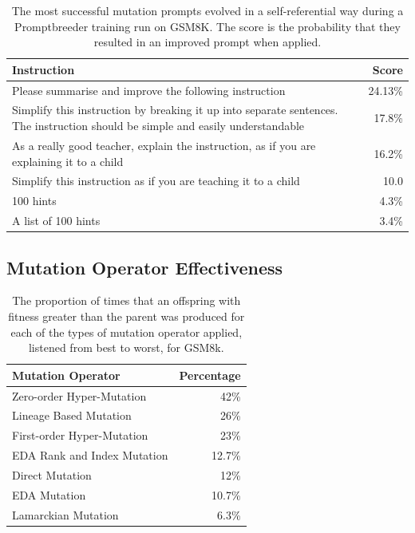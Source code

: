 \documentclass{article} %
\begin{document}
\label{appendix:evolved_mutation_prompts}
\begin{table}[h!]
\centering
\begin{tabularx}{\textwidth}{Xr}
\toprule
\textbf{Instruction} & \textbf{Score} \\
\midrule
Please summarise and improve the following instruction & 24.13\% \\
Simplify this instruction by breaking it up into separate sentences. The instruction should be simple and easily understandable & 17.8\% \\
As a really good teacher, explain the instruction, as if you are explaining it to a child & 16.2\%\\ 
Simplify this instruction as if you are teaching it to a child & 10.0 \\
100 hints & 4.3\% \\
A list of 100 hints & 3.4\% \\
\bottomrule
\end{tabularx}
\caption{The most successful mutation prompts evolved in a self-referential way during a Promptbreeder training run on GSM8K. The score is the probability that they resulted in an improved prompt when applied.}
\label{tab:my_label}
\end{table}

\subsection{Mutation Operator Effectiveness}
\label{appendix:mutation_effectivenes}
\begin{table}[h!]
\centering
\begin{tabularx}{\textwidth}{Xr}
\toprule
\textbf{Mutation Operator} & \textbf{Percentage} \\
\midrule
Zero-order Hyper-Mutation & 42\% \\
Lineage Based Mutation & 26\% \\
First-order Hyper-Mutation & 23\% \\
EDA Rank and Index Mutation & 12.7\% \\
Direct Mutation & 12\% \\
EDA Mutation & 10.7\% \\
Lamarckian Mutation & 6.3\% \\
\bottomrule
\end{tabularx}
\caption{The proportion of times that an offspring with fitness greater than the parent was produced for each of the types of mutation operator applied, listened from best to worst, for GSM8k.}
\label{tab:mutation_percentages}
\end{table}
\end{document}
